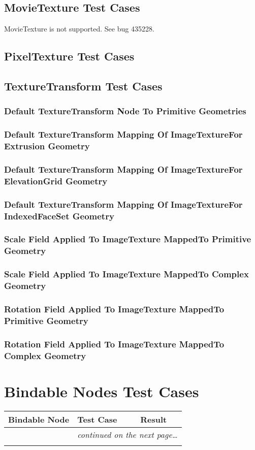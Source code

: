 \documentclass[12pt,letterpaper]{article}
\newcounter{testCaseCtr}
\newcommand{\resetTestCase}{\setcounter{testCaseCtr}{1}}
\newcommand{\TTA}{Default TextureTransform Node To Primitive Geometries}
\newcommand{\TTBa}{Default TextureTransform Mapping Of ImageTexture}
\newcommand{\TTBb}{For Extrusion Geometry}
\newcommand{\TTCa}{Default TextureTransform Mapping Of ImageTexture}
\newcommand{\TTCb}{For ElevationGrid Geometry}
\newcommand{\TTDa}{Default TextureTransform Mapping Of ImageTexture}
\newcommand{\TTDb}{For IndexedFaceSet Geometry}
\newcommand{\TTEa}{Scale Field Applied To ImageTexture Mapped}
\newcommand{\TTEb}{To Primitive Geometry}
\newcommand{\TTFa}{Scale Field Applied To ImageTexture Mapped}
\newcommand{\TTFb}{To Complex Geometry}
\newcommand{\TTGa}{Rotation Field Applied To ImageTexture Mapped}
\newcommand{\TTGb}{To Primitive Geometry}
\newcommand{\TTHa}{Rotation Field Applied To ImageTexture Mapped}
\newcommand{\TTHb}{To Complex Geometry}
\begin{document}
\subsection{MovieTexture Test Cases}
MovieTexture is not supported. See bug 435228.

\subsection{PixelTexture Test Cases}

\subsection{TextureTransform Test Cases}

\subsubsection{\TTA}
\subsubsection{\TTBa \TTBb}
\subsubsection{\TTCa \TTCb}
\subsubsection{\TTDa \TTDb}
\subsubsection{\TTEa \TTEb}
\subsubsection{\TTFa \TTFb}
\subsubsection{\TTGa \TTGb}
\subsubsection{\TTHa \TTHb}

\section{Bindable Nodes Test Cases}
\resetTestCase

\begin{center}
\setlongtables
\begin{longtable}{|l|l|l|}
\hline
\textbf{Bindable Node} & \textbf{Test Case} & \textbf{Result} \\
\hline\hline
\endhead
\cline{2-3}
 & \multicolumn{2}{|r|}{\textsl{continued on the next page\ldots}} \\
\hline
\endfoot
\hline
\endlastfoot
& & \\
\cline{2-3}
\end{longtable}
\end{center}
\end{document}
